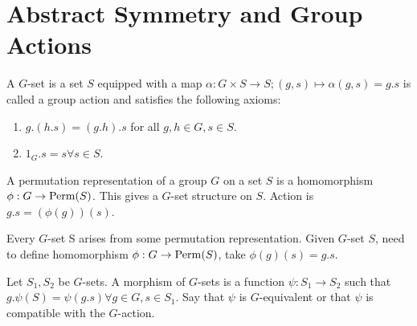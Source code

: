 \section{Abstract Symmetry and Group Actions}

\begin{definition}
    A \(G\)-set is a set \(S\) equipped with a map \(\alpha: G \times S \to S; (g, s) \mapsto \alpha(g, s) = g.s\) is called a group action and satisfies the following axioms:
    \begin{enumerate}
        \item \(g.(h.s) = (g.h).s\) for all \(g, h \in G, s \in S\).
        \item \(1_G . s = s \forall s \in S\).
    \end{enumerate}
\end{definition}

\begin{definition}
    A permutation representation of a group \(G\) on a set \(S\) is a homomorphism \(\phi: G \to \operatorname{Perm}(S)\). This gives a \(G\)-set structure on \(S\). Action is \(g.s = (\phi(g))(s)\).
\end{definition}

\begin{proposition}
    Every \(G\)-set S arises from some permutation representation. Given \(G\)-set \(S\), need to define homomorphism \(\phi: G \to \operatorname{Perm}(S)\), take \(\phi(g)(s) = g.s\).
\end{proposition}

\begin{definition}
    Let \(S_1, S_2\) be \(G\)-sets. A morphism of \(G\)-sets is a function \(\psi: S_1 \to S_2\) such that \(g.\psi(S) = \psi(g.s) \forall g \in G, s \in S_1\). Say that \(\psi\) is \(G\)-equivalent or that \(\psi\) is compatible with the \(G\)-action.
\end{definition}